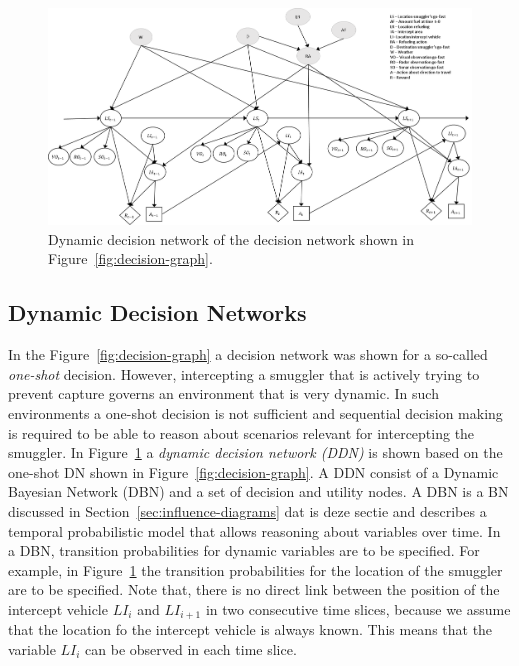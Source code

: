 \documentclass[conference]{IEEEtran}
\begin{document}
\begin{figure}[!t]
\begin{center}
 \includegraphics[width=.95\textwidth]{img/dynamic-decision-graph.png}
 \caption{Dynamic decision network of the decision network shown in Figure~\ref{fig:decision-graph}.}\label{fig:ddn} 
\end{center}
\end{figure}


\subsection{Dynamic Decision Networks}
\label{sub:dyn-dec-net}

In the Figure~\ref{fig:decision-graph} a decision network was shown for a so-called \emph{one-shot} decision. However, intercepting a smuggler that is actively trying to prevent capture governs an environment that is very dynamic. In such environments a one-shot decision is not sufficient and sequential decision making is required to be able to reason about scenarios relevant for intercepting the smuggler. In Figure~\ref{fig:ddn} a {\em dynamic decision network (DDN)} is shown based on the one-shot DN shown in Figure~\ref{fig:decision-graph}. A DDN consist of a Dynamic Bayesian Network (DBN) \cite{murphy00book} and a set of decision and utility nodes. A DBN is a BN discussed in Section~\ref{sec:influence-diagrams} {\red dat is deze sectie} and describes a temporal probabilistic model that allows reasoning about variables over time. In a DBN, transition probabilities for dynamic variables are to be specified. For example, in Figure~\ref{fig:ddn} the transition probabilities for the location of the smuggler are to be specified. Note that, there is no direct link between the position of the intercept vehicle $LI_i$ and $LI_{i+1}$ in two consecutive time slices, because we assume that the location fo the intercept vehicle is always known. This means that the variable $LI_i$ can be observed in each time slice.
\end{document}
